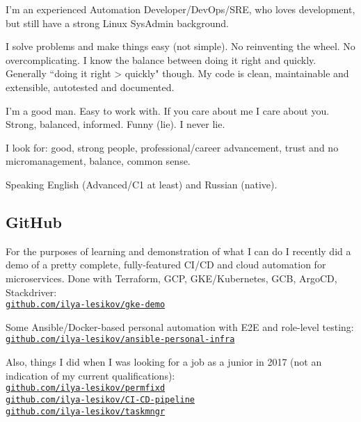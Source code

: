 \documentclass[11pt, a4paper]{article}
\newcommand{\Delimitline}{
  \vspace{-2ex}
  \noindent\makebox[\linewidth]{\rule{\DelimitlineLength}{0.12ex}} }
\newcommand\rurl[1]{%
  \-\hspace{0.5em}
  \href{http://#1}{\nolinkurl{#1}}%
}
\newcommand{\forceindent}{\leavevmode{\parindent=1em\indent}}
\begin{document}
\forceindent I'm an experienced Automation Developer/DevOps/SRE, who loves development, but still have a strong Linux SysAdmin background.

\forceindent I solve problems and make things easy (not simple). No reinventing the wheel. No overcomplicating. I know the balance between doing it right and quickly. Generally ``doing it right > quickly" though. My code is clean, maintainable and extensible, autotested and documented.

\forceindent I'm a good man. Easy to work with. If you care about me I care about you. Strong, balanced, informed. Funny (lie). I never lie.

\forceindent I look for: good, strong people, professional/career advancement, trust and no micromanagement, balance, common sense.

\forceindent Speaking English (Advanced/C1 at least) and Russian (native).


\subsection*{GitHub}
\Delimitline

\forceindent For the purposes of learning and demonstration of what I can do I recently did a demo of a pretty complete, fully-featured CI/CD and cloud automation for microservices. Done with Terraform, GCP, GKE/Kubernetes, GCB, ArgoCD, Stackdriver:\vspace{0.2em}\\
\rurl{github.com/ilya-lesikov/gke-demo}

Some Ansible/Docker-based personal automation with E2E and role-level testing:\vspace{0.2em}\\
\rurl{github.com/ilya-lesikov/ansible-personal-infra}

Also, things I did when I was looking for a job as a junior in 2017 (not an indication of my current qualifications):\vspace{0.2em}\\
\rurl{github.com/ilya-lesikov/permfixd}\\
\rurl{github.com/ilya-lesikov/CI-CD-pipeline}\\
\rurl{github.com/ilya-lesikov/taskmngr}

\end{document}
